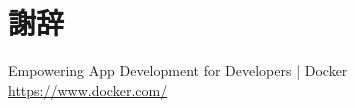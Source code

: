 \documentclass[uplatex,a4paper,12pt]{jsreport}
\begin{document}
\chapter*{謝辞}



\begin{thebibliography}{99}%

  Empowering App Development for Developers | Docker\\
  \url{https://www.docker.com/}

\end{thebibliography}
\appendix
\end{document}
